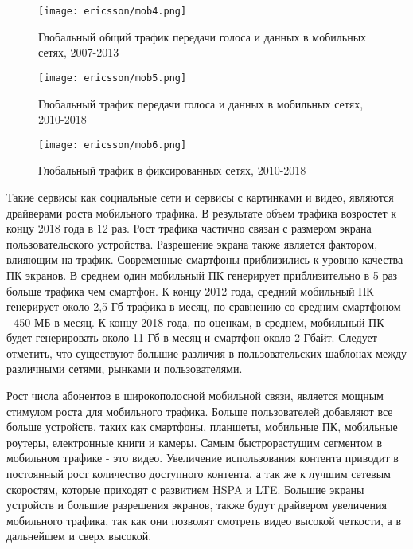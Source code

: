 \clearpage
\begin{figure} [!h]
  \center
\texttt{[image: ericsson/mob4.png]}
  \caption{Глобальный общий трафик передачи голоса и данных в мобильных сетях, 2007-2013 \cite{ericsson}}
  \label{img1:mob4}
\end{figure}

\begin{figure} [!h]
  \center
\texttt{[image: ericsson/mob5.png]}
  \caption{Глобальный трафик передачи голоса и данных в мобильных сетях, 2010-2018 \cite{ericsson}}
  \label{img1:mob5}
\end{figure}

\begin{figure} [h]
  \center
\texttt{[image: ericsson/mob6.png]}
  \caption{Глобальный трафик в фиксированных сетях, 2010-2018 \cite{ericsson}}
  \label{img1:mob6}
\end{figure}


Такие сервисы как социальные сети и сервисы с картинками и видео, являются драйверами роста мобильного трафика. В результате объем трафика возростет к концу 2018 года в 12 раз. Рост трафика частично связан с размером экрана пользовательского устройства. Разрешение экрана также является фактором, влияющим на трафик. Современные смартфоны приблизились к уровню качества ПК экранов. В среднем один мобильный ПК генерирует приблизительно в 5 раз больше трафика чем смартфон. К концу 2012 года, средний мобильный ПК генерирует около 2,5 Гб трафика в месяц, по сравнению со средним смартфоном - 450 МБ в месяц. К концу 2018 года, по оценкам, в среднем, мобильный ПК будет генерировать около 11 Гб в месяц и смартфон около 2 Гбайт. Следует отметить, что существуют большие различия в пользовательских шаблонах между различными сетями, рынками и пользователями.

Рост числа абонентов в широкополосной мобильной связи, является мощным стимулом роста для мобильного трафика. Больше пользователей добавляют все больше устройств, таких как смартфоны, планшеты, мобильные ПК, мобильные роутеры, електронные книги и камеры.  Самым быстрорастущим сегментом в мобильном трафике - это видео. Увеличение использования контента приводит в постоянный рост количество доступного контента, а так же к лучшим сетевым скоростям, которые приходят с развитием HSPA и LTE. Большие экраны устройств и большие разрешения экранов, также будут драйвером увеличения мобильного трафика, так как они позволят смотреть видео высокой четкости, а в дальнейшем и сверх высокой. 

